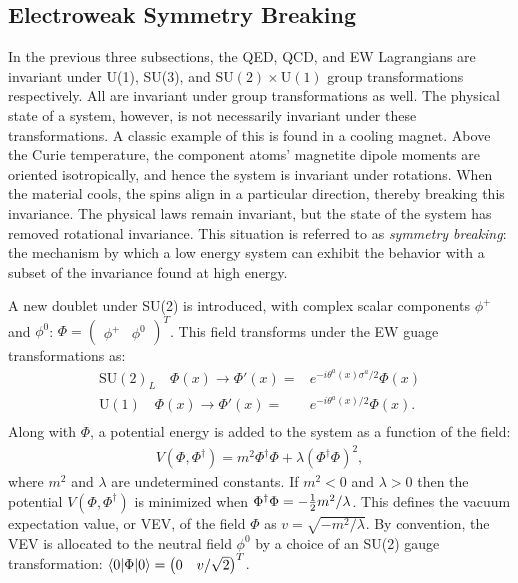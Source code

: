 \subsection{Electroweak Symmetry Breaking}\label{sec:higgsMechanism}

In the previous three subsections, the QED, QCD, and EW Lagrangians are invariant under U(1), SU(3), and $\text{SU}(2)\times\text{U}(1)$ group transformations respectively.
All are invariant under \poincare group transformations as well.
The physical state of a system, however, is not necessarily invariant under these transformations.
A classic example of this is found in a cooling magnet.
Above the Curie temperature, the component atoms' magnetite dipole moments are oriented isotropically, and hence the system is invariant under rotations.
When the material cools, the spins align in a particular direction, thereby breaking this invariance.
The physical laws remain invariant, but the state of the system has removed rotational invariance.
This situation is referred to as \emph{symmetry breaking}: the mechanism by which a low energy system can exhibit the behavior with a subset of the invariance found at high energy.

A new doublet under SU(2) is introduced, with complex scalar components $\phi^+$ and $\phi^0$: $\Phi=\begin{pmatrix}\phi^+&\phi^0\end{pmatrix}^T$.
This field transforms under the EW guage transformations as:
\begin{equation}\begin{split}\label{eqn:scalarTransform}
    \text{SU}(2)_L\quad\Phi(x)\to\Phi'(x)=&e^{-i\theta^a(x)\sigma^a/2}\Phi(x) \\
    \text{U}(1)\quad\Phi(x)\to\Phi'(x)=&e^{-i\theta^a(x)/2}\Phi(x). \\
\end{split}\end{equation}
Along with $\Phi$, a potential energy is added to the system as a function of the field:
\begin{equation}\begin{split}
V(\Phi,\Phi^\dagger)=m^2\Phi^\dagger\Phi+\lambda(\Phi^\dagger\Phi)^2,
\end{split}\end{equation}
where $m^2$ and $\lambda$ are undetermined constants.
If $m^2<0$ and $\lambda>0$ then the potential $V(\Phi,\Phi^\dagger)$ is minimized when $\Phi^\dagger\Phi=-\frac{1}{2} m^2/\lambda$.
This defines the vacuum expectation value, or VEV, of the field $\Phi$ as $v=\sqrt{-m^2/\lambda}$.
By convention, the VEV is allocated to the neutral field $\phi^0$ by a choice of an SU(2) gauge transformation: $\braket{0|\Phi|0}=\begin{pmatrix}0&v/\sqrt{2}\end{pmatrix}^T$.

